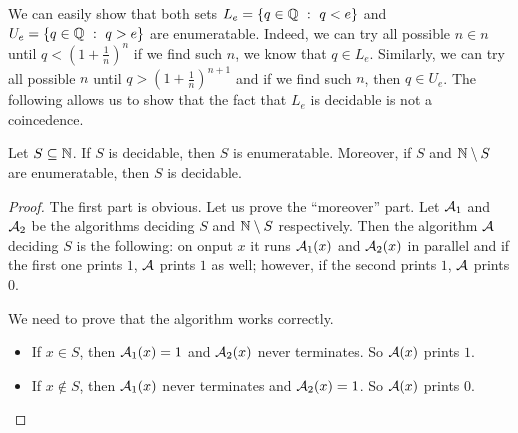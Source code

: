 We can easily show that both sets $L_e = \set[q < e]{q \in \Q}$ and
$U_e = \set[q > e]{q \in \Q}$ are enumeratable. Indeed, we can try all possible
$n \in n$ until $q < (1 + \frac{1}{n})^n$ if we find such $n$, we know that
$q \in L_e$. Similarly, we can try all possible $n$ until
$q > (1 + \frac{1}{n})^{n + 1}$ and if we find such $n$, then $q \in U_e$.
The following allows us to show that the fact that $L_e$ is decidable is not
a coincedence.
\begin{theorem}
\label{theorem:enumeratable-to-decidable}
  Let $S \subseteq \mathbb{N}$. If $S$ is decidable, then $S$ is enumeratable.
  Moreover, if $S$ and $\mathbb{N} \setminus S$ are enumeratable, then $S$ is
  decidable.
\end{theorem}
\begin{proof}
  The first part is obvious. Let us prove the ``moreover'' part.
  Let $\mathcal{A}_1$ and $\mathcal{A}_2$ be the algorithms deciding
  $S$ and $\mathbb{N} \setminus S$ respectively. Then the algorithm $\mathcal{A}$
  deciding $S$ is the following: on onput $x$ it runs $\mathcal{A}_1(x)$ and
  $\mathcal{A}_2(x)$ in parallel and if the first one prints $1$,
  $\mathcal{A}$ prints $1$ as well;
  however, if the second prints $1$, $\mathcal{A}$ prints $0$.

  We need to prove that the algorithm works correctly.
  \begin{itemize}
    \item If $x \in S$, then $\mathcal{A}_1(x) = 1$ and $\mathcal{A}_2(x)$
      never terminates. So $\mathcal{A}(x)$ prints $1$.
    \item If $x \notin S$, then $\mathcal{A}_1(x)$ never terminates and
      $\mathcal{A}_2(x) = 1$. So $\mathcal{A}(x)$ prints $0$.
  \end{itemize}
\end{proof}

